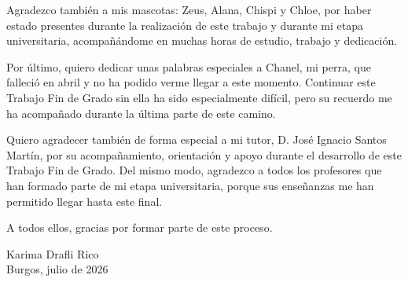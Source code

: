 \documentclass[a4paper,12pt,oneside]{memoir}
\begin{document}
Agradezco también a mis mascotas: Zeus, Alana, Chispi y Chloe, por haber estado presentes durante la realización de este trabajo y durante mi etapa universitaria, acompañándome en muchas horas de estudio, trabajo y dedicación.

Por último, quiero dedicar unas palabras especiales a Chanel, mi perra, que falleció en abril y no ha podido verme llegar a este momento. Continuar este Trabajo Fin de Grado sin ella ha sido especialmente difícil, pero su recuerdo me ha acompañado durante la última parte de este camino.

Quiero agradecer también de forma especial a mi tutor, D. José Ignacio Santos Martín, por su acompañamiento, orientación y apoyo durante el desarrollo de este Trabajo Fin de Grado. Del mismo modo, agradezco a todos los profesores que han formado parte de mi etapa universitaria, porque sus enseñanzas me han permitido llegar hasta este final.

A todos ellos, gracias por formar parte de este proceso.

\vspace{2cm}

\begin{flushright}
Karima Drafli Rico\\
Burgos, julio de 2026
\end{flushright}

\clearpage

\setlength{\absleftindent}{0pt}
\setlength{\absrightindent}{0pt}
\end{document}

